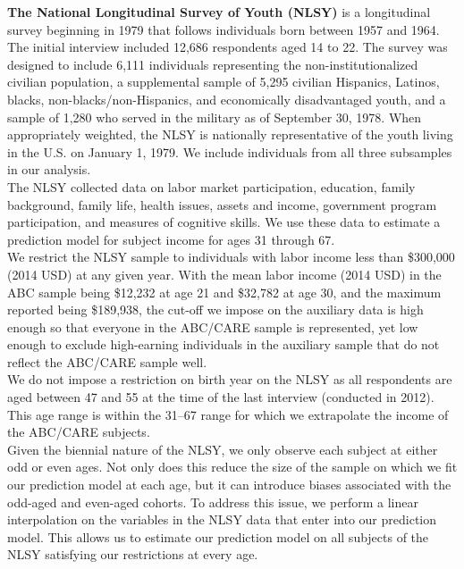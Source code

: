 \noindent \textbf{The National Longitudinal Survey of Youth (NLSY)} is a longitudinal survey beginning in 1979 that follows individuals born between 1957 and 1964. The initial interview included 12,686 respondents aged 14 to 22. The survey was designed to include 6,111 individuals representing the non-institutionalized civilian population, a supplemental sample of 5,295 civilian Hispanics, Latinos, blacks, non-blacks/non-Hispanics, and economically disadvantaged youth, and a sample of 1,280 who served in the military as of September 30, 1978. When appropriately weighted, the NLSY is nationally representative of the youth living in the U.S. on January 1, 1979. We include individuals from all three subsamples in our analysis. \\

\noindent The NLSY collected data on labor market participation, education, family background, family life, health issues, assets and income, government program participation, and measures of cognitive skills. We use these data to estimate a prediction model for subject income for ages 31 through 67. \\

\noindent We restrict the NLSY sample to individuals with labor income less than \$300,000 (2014 USD) at any given year. With the mean labor income (2014 USD) in the ABC sample being \$12,232 at age 21 and \$32,782 at age 30, and the maximum reported being \$189,938, the cut-off we impose on the auxiliary data is high enough so that everyone in the ABC/CARE sample is represented, yet low enough to exclude high-earning individuals in the auxiliary sample that do not reflect the ABC/CARE sample well. \\

\noindent We do not impose a restriction on birth year on the NLSY as all respondents are aged between 47 and 55 at the time of the last interview (conducted in 2012). This age range is within the 31--67 range for which we extrapolate the income of the ABC/CARE subjects. \\

\noindent Given the biennial nature of the NLSY, we only observe each subject at either odd or even ages. Not only does this reduce the size of the sample on which we fit our prediction model at each age, but it can introduce biases associated with the odd-aged and even-aged cohorts. To address this issue, we perform a linear interpolation on the variables in the NLSY data that enter into our prediction model. This allows us to estimate our prediction model on all subjects of the NLSY satisfying our restrictions at every age. \\

